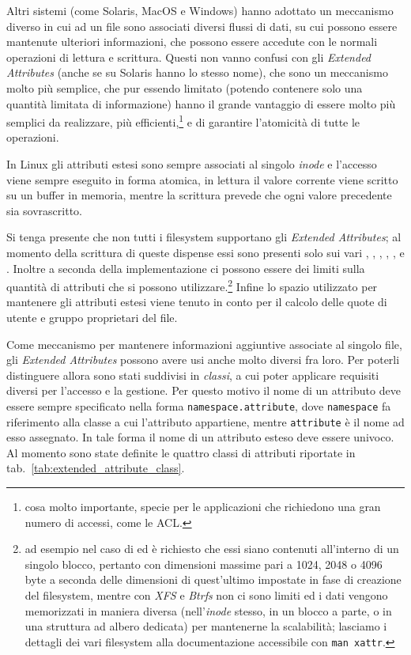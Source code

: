 Altri sistemi (come Solaris, MacOS e Windows) hanno adottato un meccanismo
diverso in cui ad un file sono associati diversi flussi di dati, su cui
possono essere mantenute ulteriori informazioni, che possono essere accedute
con le normali operazioni di lettura e scrittura. Questi non vanno confusi con
gli \textit{Extended Attributes} (anche se su Solaris hanno lo stesso nome),
che sono un meccanismo molto più semplice, che pur essendo limitato (potendo
contenere solo una quantità limitata di informazione) hanno il grande
vantaggio di essere molto più semplici da realizzare, più
efficienti,\footnote{cosa molto importante, specie per le applicazioni che
  richiedono una gran numero di accessi, come le ACL.} e di garantire
l'atomicità di tutte le operazioni.

In Linux gli attributi estesi sono sempre associati al singolo \textit{inode}
e l'accesso viene sempre eseguito in forma atomica, in lettura il valore
corrente viene scritto su un buffer in memoria, mentre la scrittura prevede
che ogni valore precedente sia sovrascritto.

Si tenga presente che non tutti i filesystem supportano gli \textit{Extended
  Attributes}; al momento della scrittura di queste dispense essi sono
presenti solo sui vari , , ,
, ,  e .  Inoltre a
seconda della implementazione ci possono essere dei limiti sulla quantità di
attributi che si possono utilizzare.\footnote{ad esempio nel caso di
   ed  è richiesto che essi siano contenuti
  all'interno di un singolo blocco, pertanto con dimensioni massime pari a
  1024, 2048 o 4096 byte a seconda delle dimensioni di quest'ultimo impostate
  in fase di creazione del filesystem, mentre con \textsl{XFS} e
  \textsl{Btrfs} non ci sono limiti ed i dati vengono memorizzati in maniera
  diversa (nell'\textit{inode} stesso, in un blocco a parte, o in una
  struttura ad albero dedicata) per mantenerne la scalabilità; lasciamo i
  dettagli dei vari filesystem alla documentazione accessibile con \texttt{man
    xattr}.} Infine lo spazio utilizzato per mantenere gli attributi estesi
viene tenuto in conto per il calcolo delle quote di utente e gruppo
proprietari del file.

Come meccanismo per mantenere informazioni aggiuntive associate al singolo
file, gli \textit{Extended Attributes} possono avere usi anche molto diversi
fra loro.  Per poterli distinguere allora sono stati suddivisi in
\textsl{classi}, a cui poter applicare requisiti diversi per l'accesso e la
gestione. Per questo motivo il nome di un attributo deve essere sempre
specificato nella forma \texttt{namespace.attribute}, dove \texttt{namespace}
fa riferimento alla classe a cui l'attributo appartiene, mentre
\texttt{attribute} è il nome ad esso assegnato. In tale forma il nome di un
attributo esteso deve essere univoco. Al momento sono state definite le
quattro classi di attributi riportate in
tab.~\ref{tab:extended_attribute_class}.

